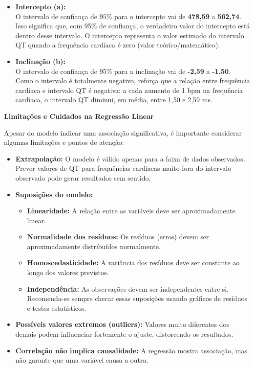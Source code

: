 \documentclass[
]{book}
\providecommand{\tightlist}{%
  \setlength{\itemsep}{0pt}\setlength{\parskip}{0pt}}
\begin{document}
\begin{itemize}
\item
  \textbf{Intercepto (a):}\\
  O intervalo de confiança de 95\% para o intercepto vai de \textbf{478,59} a \textbf{562,74}. Isso significa que, com 95\% de confiança, o verdadeiro valor do intercepto está dentro desse intervalo. O intercepto representa o valor estimado do intervalo QT quando a frequência cardíaca é zero (valor teórico/matemático).
\item
  \textbf{Inclinação (b):}\\
  O intervalo de confiança de 95\% para a inclinação vai de \textbf{-2,59} a \textbf{-1,50}. Como o intervalo é totalmente negativo, reforça que a relação entre frequência cardíaca e intervalo QT é negativa: a cada aumento de 1 bpm na frequência cardíaca, o intervalo QT diminui, em média, entre 1,50 e 2,59 ms.
\end{itemize}

\textbf{Limitações e Cuidados na Regressão Linear}

Apesar do modelo indicar uma associação significativa, é importante considerar algumas limitações e pontos de atenção:

\begin{itemize}
\tightlist
\item
  \textbf{Extrapolação:} O modelo é válido apenas para a faixa de dados observados. Prever valores de QT para frequências cardíacas muito fora do intervalo observado pode gerar resultados sem sentido.
\item
  \textbf{Suposições do modelo:}

  \begin{itemize}
  \tightlist
  \item
    \textbf{Linearidade:} A relação entre as variáveis deve ser aproximadamente linear.
  \item
    \textbf{Normalidade dos resíduos:} Os resíduos (erros) devem ser aproximadamente distribuídos normalmente.
  \item
    \textbf{Homoscedasticidade:} A variância dos resíduos deve ser constante ao longo dos valores previstos.
  \item
    \textbf{Independência:} As observações devem ser independentes entre si.
    Recomenda-se sempre checar essas suposições usando gráficos de resíduos e testes estatísticos.
  \end{itemize}
\item
  \textbf{Possíveis valores extremos (outliers):} Valores muito diferentes dos demais podem influenciar fortemente o ajuste, distorcendo os resultados.
\item
  \textbf{Correlação não implica causalidade:} A regressão mostra associação, mas não garante que uma variável causa a outra.
\end{itemize}
\end{document}
